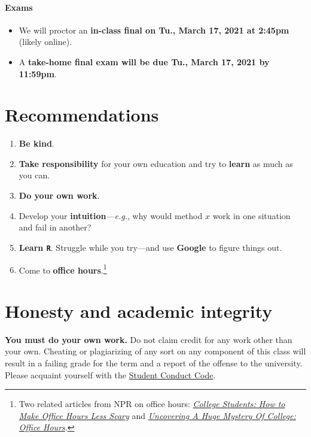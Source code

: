\documentclass[10pt]{article}
\newcommand{\emf}[1]{\textbf{\textcolor{grass_green}{#1}}}
\begin{document}
\paragraph{Exams}
\begin{itemize}
  \item We will proctor an \emf{in-class final on Tu., March 17, 2021 at 2:45pm} (likely online).
  \item A \emf{take-home final exam will be due Tu., March 17, 2021 by 11:59pm}.
\end{itemize}

\section*{Recommendations}

\begin{enumerate}
  \item \emf{Be kind}.
  \item \emf{Take responsibility} for your own education and try to \emf{learn} as much as you can.
  \item \emf{Do your own work}.
  \item Develop your \emf{intuition}---\textit{e.g.}, why would method $x$ work in one situation and fail in another?
  \item \emf{Learn \texttt{R}}. Struggle while you try---and use \emf{Google} to figure things out.
  \item Come to \emf{office hours}.\footnote{Two related articles from NPR on office hours: \href{https://www.npr.org/2019/10/05/678815966/college-students-how-to-make-office-hours-less-scary}{\textit{College Students: How to Make Office Hours Less Scary}} and \href{https://www.npr.org/2019/10/02/766568824/uncovering-a-huge-mystery-of-college-office-hours}{\textit{Uncovering A Huge Mystery Of College: Office Hours}}.}
\end{enumerate}

\section*{Honesty and academic integrity}

\emf{You must do your own work.} Do not claim credit for any work other than your own. Cheating or plagiarizing of any sort on any component of this class will result in a failing grade for the term and a report of the offense to the university. Please acquaint yourself with the \href{http://studentlife.uoregon.edu}{Student Conduct Code}.
\end{document}
